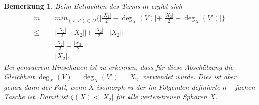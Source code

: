 \documentclass[12pt,titlepage,twoside,cleardoublepage]{article}
\theoremstyle{nummermitklammern}
\newtheorem{bemerkung}[temp]{Bemerkung}
\newtheorem{bemerkung}[zahl]{Bemerkung}
\numberwithin{equation}{section}
\begin{document}
\begin{bemerkung}
Beim Betrachten des Terms $m$ ergibt sich
\begin{align*}
m=&min_{(V,V')\in D}\{\vert\frac{\vert X_2 \vert}{2}-\deg_X(V)\vert +\vert \frac{\vert X_2 \vert}{2}-\deg_X(V')\vert\}\\
\leq& \vert\frac{\vert X_2 \vert}{2}-\vert X_2\vert\vert +\vert \frac{\vert X_2 \vert}{2}-\vert X_2\vert\vert \\
=&\frac{\vert X_2 \vert}{2}+\frac{\vert X_2 \vert}{2}\\
=&\vert X_2 \vert.
\end{align*}
Bei genauerem Hinschauen ist zu erkennen, dass für diese Abschätzung die Gleichheit $\deg_X(V)=\deg_X(V')=\vert X_2 \vert$ verwendet wurde. Dies ist aber genau dann der Fall, wenn $X$ isomorph zu der im Folgenden definierte $n-$fachen Tasche ist. 
Damit ist $\zeta (X)< \vert X_2 \vert$ für alle vertex-treuen Sphären $X$. 
\end{bemerkung}
\end{document}
